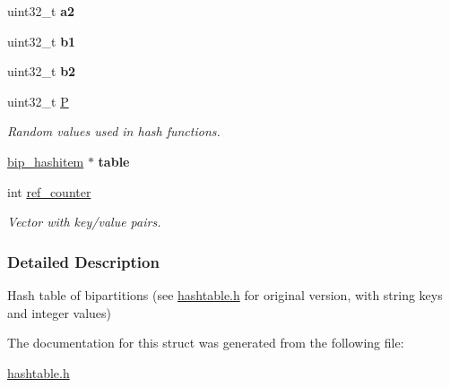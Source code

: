 \begin{DoxyCompactItemize}
\mbox{\label{structbip__hashtable__struct_a6f7552b78ecdf55700939433b37e87e6}} 
uint32\+\_\+t {\bfseries a2}
\item 
\mbox{\label{structbip__hashtable__struct_a168857c41fa3b69ed7e182b54d6c0eec}} 
uint32\+\_\+t {\bfseries b1}
\item 
\mbox{\label{structbip__hashtable__struct_a1a121d5300cd180192ff50d2e5d07e73}} 
uint32\+\_\+t {\bfseries b2}
\item 
\mbox{\label{structbip__hashtable__struct_a069f02825833c148d16c419b1e8e6df2}} 
uint32\+\_\+t \hyperlink{structbip__hashtable__struct_a069f02825833c148d16c419b1e8e6df2}{P}
\begin{DoxyCompactList}\small\item\em Random values used in hash functions. \end{DoxyCompactList}\item 
\mbox{\label{structbip__hashtable__struct_aac0467a670a14218bc714cacbbda208a}} 
\hyperlink{structbip__hashitem__struct}{bip\+\_\+hashitem} $\ast$ {\bfseries table}
\item 
\mbox{\label{structbip__hashtable__struct_a5dea92a2e0bb95a46baf5fe77822d479}} 
int \hyperlink{structbip__hashtable__struct_a5dea92a2e0bb95a46baf5fe77822d479}{ref\+\_\+counter}
\begin{DoxyCompactList}\small\item\em Vector with key/value pairs. \end{DoxyCompactList}\end{DoxyCompactItemize}


\subsubsection{Detailed Description}
Hash table of bipartitions (see \hyperlink{structhashtable__struct_ae77d63df7a927e68de61d431d5bc0ddc}{hashtable.\+h} for original version, with string keys and integer values) 

The documentation for this struct was generated from the following file\+:\begin{DoxyCompactItemize}
\item 
\hyperlink{hashtable_8h}{hashtable.\+h}\end{DoxyCompactItemize}

